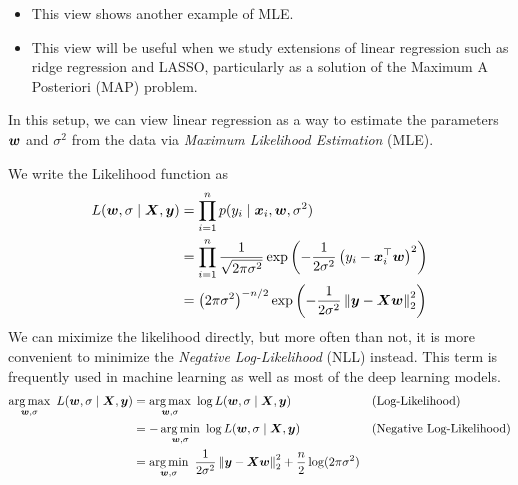 \documentclass[letterpaper,12pt]{article}
\theoremstyle{plain}
\theoremstyle{definition}
\theoremstyle{remark}
\newcommand{\norm}[1]{\left\lVert#1\right\rVert}
\begin{document}
\begin{itemize}[leftmargin=*]
    \item This view shows another example of MLE.
    \item This view will be useful when we study extensions of linear regression such as ridge regression and LASSO, particularly as a solution of the Maximum A Posteriori (MAP) problem.
\end{itemize}
%
In this setup, we can view linear regression as a way to estimate the parameters ${\bm{w}}$ and $\sigma^2$ from the data via \emph{Maximum Likelihood Estimation} (MLE).

We write the Likelihood function as
\begin{align}
    L(\vw, \sigma \mid \mX, \vy) & = \prod_{i=1}^n p(y_i \mid \vx_i, \vw, \sigma^2) \label{eq:likelihood}                                                          \\
                                 & = \prod_{i=1}^n \frac{1}{\sqrt{2 \pi \sigma^2}} \exp \left( -\frac{1}{2 \sigma^2} \left( y_i - \vx_i^\top \vw \right)^2 \right) \\
                                 & = \left(2 \pi \sigma^2\right)^{-n/2} \exp \left( -\frac{1}{2 \sigma^2} \norm{\vy - \mX \vw}_2^2 \right)
\end{align}
We can miximize the likelihood directly, but more often than not, it is more convenient to minimize the \emph{Negative Log-Likelihood} (NLL) instead.
%
This term is frequently used in machine learning as well as most of the deep learning models.
\begin{align}
    \argmax_{\vw, \sigma}~ L(\vw, \sigma \mid \mX, \vy) & = \argmax_{\vw, \sigma}~ \log L(\vw, \sigma \mid \mX, \vy)                                                &  & \text{(Log-Likelihood)}          \\
                                                        & = - \argmin_{\vw, \sigma}~ \log L(\vw, \sigma \mid \mX, \vy)                                              &  & \text{(Negative Log-Likelihood)} \\
                                                        & = \argmin_{\vw, \sigma}~ \frac{1}{2 \sigma^2} \norm{\vy - \mX \vw}_2^2 + \frac{n}{2} \log (2\pi \sigma^2)
\end{align}
\end{document}
